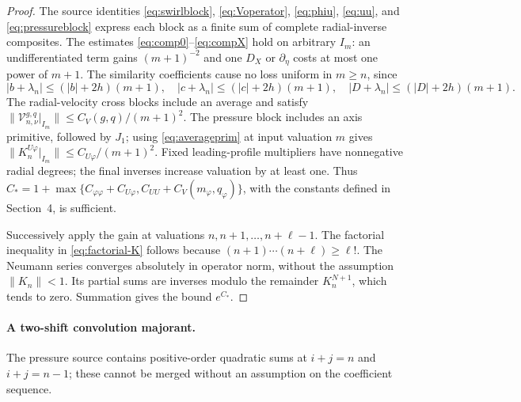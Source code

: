 \begin{proof}
The source identities \eqref{eq:swirlblock}, \eqref{eq:Voperator}, \eqref{eq:phiu}, \eqref{eq:uu}, and \eqref{eq:pressureblock} express each block as a finite sum of complete radial-inverse composites. The estimates \eqref{eq:comp0}--\eqref{eq:compX} hold on arbitrary $I_m$: an undifferentiated term gains $(m+1)^{-2}$ and one $D_X$ or $\partial_\eta$ costs at most one power of $m+1$. The similarity coefficients cause no loss uniform in $m\ge n$, since
\[
 |b+\lambda_n|\le(|b|+2h)(m+1),\quad
 |c+\lambda_n|\le(|c|+2h)(m+1),\quad
 |D+\lambda_n|\le(|D|+2h)(m+1).
\]
The radial-velocity cross blocks include an average and satisfy
$\|\mathcal V_{n,\nu}^{g,q}|_{I_m}\|\le C_V(g,q)/(m+1)^2$.
The pressure block includes an axis primitive, followed by $J_1$;
using \eqref{eq:averageprim} at input valuation $m$ gives
$\|K_n^{U\varphi}|_{I_m}\|\le C_{U\varphi}/(m+1)^2$.
Fixed leading-profile multipliers have nonnegative radial degrees;
the final inverses increase valuation by at least one.
Thus $C_*=1+\max\{C_{\varphi\varphi}+C_{U\varphi},
 C_{UU}+C_V(m_\varphi,q_\varphi)\}$, with the constants
defined in Section~4, is sufficient.

Successively apply the gain at valuations $n,n+1,\ldots,n+\ell-1$.
The factorial inequality in \eqref{eq:factorial-K} follows because
$(n+1)\cdots(n+\ell)\ge\ell!$. The Neumann series converges
absolutely in operator norm, without the assumption $\|K_n\|<1$.
Its partial sums are inverses modulo the remainder $K_n^{N+1}$,
which tends to zero. Summation gives the bound $e^{C_*}$.
\end{proof}

\paragraph{A two-shift convolution majorant.}
The pressure source contains positive-order quadratic sums at
$i+j=n$ and $i+j=n-1$; these cannot be merged without an assumption
on the coefficient sequence.

